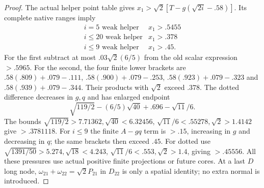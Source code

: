 \begin{proof}
The actual helper point table gives
$x_1>\sqrt2[T-g(\sqrt{2i}-.58)]$. Its complete native ranges imply
\[
\begin{array}{c|c}
i=5\text{ weak helper}&x_1>.5455\\
i\le20\text{ weak helper}&x_1>.378\\
i\le9\text{ weak helper}&x_1>.45 .
\end{array}
\]
For the first subtract at most $.03\sqrt2(6/5)$ from the old
scalar expression $>.5965$. For the second, the four finite lower
brackets are $.58(.809)+.079-.111$,
$.58(.900)+.079-.253$, $.58(.923)+.079-.323$ and
$.58(.939)+.079-.344$. Their products with $\sqrt2$ exceed $.378$.
The dotted difference decreases in $g,q$ and has enlarged endpoint
\[
 \sqrt{119/2}-(6/5)\sqrt{40}+.696-\sqrt{11}/6.
\]
The bounds $\sqrt{119/2}>7.71362,\sqrt{40}<6.32456$,
$\sqrt{11}/6<.55278,\sqrt2>1.4142$ give $>.3781118$.
For $i\le9$ the finite $A-gq$ term is $>.15$, increasing in $g$
and decreasing in $q$; the same brackets then exceed $.45$.
For dotted use $\sqrt{1391/50}>5.274,\sqrt{18}<4.243$,
$\sqrt{11}/6<.553,\sqrt2>1.4$, giving $>.45556$.
All these pressures use actual positive finite projections or future
cores. At a last $D$ long node, $\omega_{21}+\omega_{22}=\sqrt2P_{21}$
in $D_{22}$ is only a spatial identity; no extra normal is introduced.
\end{proof}

